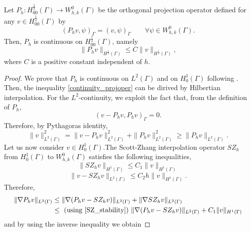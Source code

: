 \begin{lemma}
Let $P_h: H^{\frac 12}_{00}(\Gamma) \longrightarrow W_{h,k}^0(\Gamma)$ be the orthogonal projection operator defined  for any $v \in H^{\frac 12}_{00}(\Gamma)$ by
\begin{equation*}
(P_h v , \psi)_\Gamma= (v, \psi)_\Gamma \qquad \forall \psi \in W_{h,k}^0(\Gamma).  
\end{equation*} 
Then, $P_h$ is continuous on $H^{\frac 12}_{00}(\Gamma)$, namely
\begin{equation}\label{continuity_projoper}
\|P_h v\|_{H^{\frac 12}(\Gamma)} \leq C \|v\|_{H^{\frac 12}(\Gamma)},
\end{equation}
where $C$ is a positive constant independent of $h$.
\end{lemma}
\begin{proof}
We prove that $P_h$ is continuous on $L^2(\Gamma)$ and on $H^1_0(\Gamma)$ following \cite[Section 1.6.3]{MR2050138}.  Then, the inequality \eqref{continuity_projoper} can be dirived by Hilbertian interpolation. For the $L^2$-continuity, we exploit the fact that, from the definition of $P_h$,
\begin{equation*}
(v-P_h v,P_h v)_{\Gamma}=0.
\end{equation*} 
Therefore, by Pythagoras identity,
\begin{equation*}
\|v\|^2_{L^2(\Gamma)} = \|v-P_h v\|_{L^2(\Gamma)}^2 + \|P_h v\|_{L^2(\Gamma)}^2 \geq \|P_h v\| _{L^2(\Gamma)}.
\end{equation*}
Let us now consider $v\in H^1_0(\Gamma)$.The Scott-Zhang interpolation operator $SZ_h$ from $H^1_0(\Gamma)$ to $W_{h,k}^0(\Gamma)$ satisfies the following inequalities,
\begin{equation}\label{SZ_stability}
\|SZ_h v\|_{H^1(\Gamma)} \leq C_1 \|v\|_{H^1(\Gamma)}
\end{equation} 
\begin{equation}\label{SZ_approx}
\|v -SZ_h v \|_{L^2(\Gamma)}\leq C_2 h \|v\|_{H^1(\Gamma)}.
\end{equation}
Therefore,
\begin{equation*}
\begin{split}
\|\nabla P_h v\|_{L^2(\Gamma)} 
&\leq \|\nabla (P_h v - SZ_h v)\|_{L^2(\Gamma)} + \|\nabla SZ_h v\|_{L^2(\Gamma)}\\
&\leq \text{ (using \eqref{SZ_stability}) } \|\nabla (P_h v - SZ_h v)\|_{L^2(\Gamma)} + C_1\|v\|_{H^1(\Gamma)}
\end{split}
\end{equation*}
and by using the inverse inequality we obtain

\end{proof}

